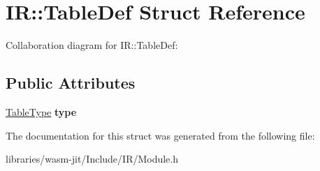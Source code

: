 \hypertarget{struct_i_r_1_1_table_def}{}\section{IR\+:\+:Table\+Def Struct Reference}
\label{struct_i_r_1_1_table_def}


Collaboration diagram for IR\+:\+:Table\+Def\+:
\subsection*{Public Attributes}
\begin{DoxyCompactItemize}
\item 
\mbox{\label{struct_i_r_1_1_table_def_a04586a2ec874f32848ba8ff562862711}} 
\mbox{\hyperlink{struct_i_r_1_1_table_type}{Table\+Type}} {\bfseries type}
\end{DoxyCompactItemize}


The documentation for this struct was generated from the following file\+:\begin{DoxyCompactItemize}
\item 
libraries/wasm-\/jit/\+Include/\+I\+R/Module.\+h\end{DoxyCompactItemize}
